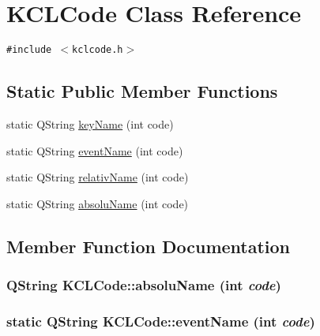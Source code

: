 \hypertarget{class_k_c_l_code}{
\section{KCLCode Class Reference}
\label{class_k_c_l_code}
}
{\tt \#include $<$kclcode.h$>$}

\subsection*{Static Public Member Functions}
\begin{CompactItemize}
\item 
static QString \hyperlink{class_k_c_l_code_2b4ae042dbc8622b23bc025506aff9af}{keyName} (int code)
\item 
static QString \hyperlink{class_k_c_l_code_220faab8799839c0990bfab94921fef0}{eventName} (int code)
\item 
static QString \hyperlink{class_k_c_l_code_8d559916777d0147c8863b869392004a}{relativName} (int code)
\item 
static QString \hyperlink{class_k_c_l_code_9b4daee151b687abef17c9600a43dec3}{absoluName} (int code)
\end{CompactItemize}


\subsection{Member Function Documentation}
\hypertarget{class_k_c_l_code_9b4daee151b687abef17c9600a43dec3}{
\subsubsection[{absoluName}]{\setlength{\rightskip}{0pt plus 5cm}QString KCLCode::absoluName (int {\em code})}}
\label{class_k_c_l_code_9b4daee151b687abef17c9600a43dec3}


\hypertarget{class_k_c_l_code_220faab8799839c0990bfab94921fef0}{
\subsubsection[{eventName}]{\setlength{\rightskip}{0pt plus 5cm}static QString KCLCode::eventName (int {\em code})}}
\label{class_k_c_l_code_220faab8799839c0990bfab94921fef0}


